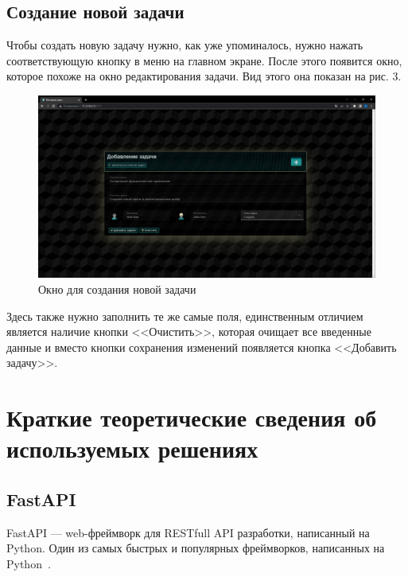 \documentclass{altsu-report}
\begin{document}
\section*{Создание новой задачи}

Чтобы создать новую задачу нужно, как уже упоминалось, нужно нажать соответствующую кнопку в меню на главном экране. После этого появится окно, которое похоже на окно редактирования задачи. Вид этого она показан на рис. 3.

\begin{figure}[H]
    \centering
    \includegraphics[scale=0.3]{add_task.png}
    \caption{Окно для создания новой задачи}
    \label{fig:addtask}
\end{figure}

Здесь также нужно заполнить те же самые поля, единственным отличием является наличие кнопки <<Очистить>>, которая очищает все введенные данные и вместо кнопки сохранения изменений появляется кнопка <<Добавить задачу>>.

\chapter*{Краткие теоретические сведения об используемых решениях}

\section*{FastAPI}

FastAPI --- web-фреймворк для RESTfull API разработки, написанный на Python. Один из самых быстрых и популярных фреймворков, написанных на Python~\cite{FastAPI_wiki}.
\end{document}
